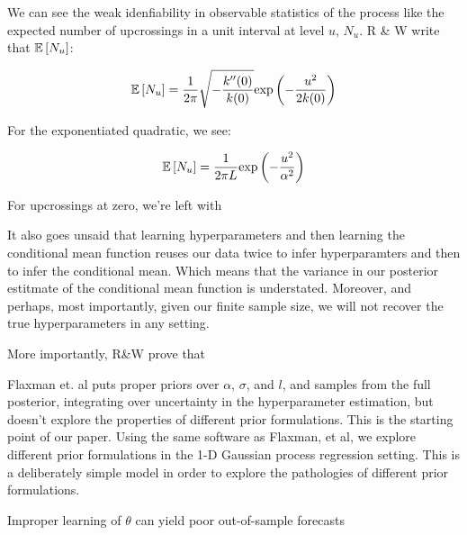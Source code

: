 \documentclass{article}
\newcommand{\Exp}[1]{\ensuremath{\mathbb{E} \lb #1 \rb}}
\newcommand{\lb}{\ensuremath{\left[}}
\newcommand{\rb}{\ensuremath{\right]}}
\begin{document}
We can see the weak idenfiability in observable statistics of the process like
the expected number of upcrossings in a unit interval at level $u$, $N_u$. R \&
W write that $\Exp{N_u}$:

\[ 
  \Exp{N_u} = \dfrac{1}{2 \pi} 
  \sqrt{-\dfrac{k^{\prime \prime}(0)}{k(0)}}
  \text{exp}\left(-\dfrac{u^2}{2k(0)}\right)
\]

For the exponentiated quadratic, we see:

\[ 
  \Exp{N_u} = \dfrac{1}{2 \pi L}\text{exp}\left(-\dfrac{u^2}{\alpha ^ 2} \right)
\]

For upcrossings at zero, we're left with 

It also goes unsaid that learning hyperparameters and then learning the
conditional mean function reuses our data twice to infer hyperparamters and
then to infer the conditional mean. Which means that the variance in our
posterior estitmate of the conditional mean function is understated.  Moreover,
and perhaps, most importantly, given our finite sample size, we will not
recover the true hyperparameters in any setting. 

More importantly, R\&W prove that 


Flaxman et. al puts proper priors over $\alpha$, $\sigma$, and $l$, and samples
from the full posterior, integrating over uncertainty in the hyperparameter
estimation, but doesn't explore the properties of different prior formulations.
This is the starting point of our paper. Using the same software as Flaxman, et
al, we explore different prior formulations in the 1-D Gaussian process
regression setting.  This is a deliberately simple model in order to explore
the pathologies of different prior formulations.


Improper learning of $\theta$ can yield poor out-of-sample forecasts 
\end{document}
